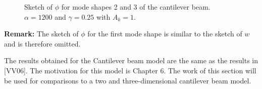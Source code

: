 \documentclass[../../main.tex]{subfiles}
\begin{document}
\begin{figure}[h!]
	
	
	\caption{Sketch of $\phi$ for mode shapes 2 and 3 of the cantilever beam. $\alpha = 1200$ and $\gamma = 0.25$ with $A_k = 1$.}
\end{figure}

\FloatBarrier
\textbf{Remark:} The sketch of $\phi$ for the first mode shape is similar to the sketch of $w$ and is therefore omitted.\\
\FloatBarrier

The results obtained for the Cantilever beam model are the same as the results in [VV06]. The motivation for this model is Chapter 6. The work of this section will be used for comparisons to a two and three-dimensional cantilever beam model.
\end{document}
